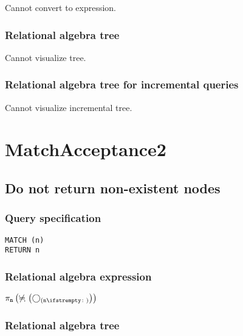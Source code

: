 Cannot convert to expression.

\subsubsection*{Relational algebra tree}

Cannot visualize tree.

\subsubsection*{Relational algebra tree for incremental queries}

Cannot visualize incremental tree.

\section{MatchAcceptance2}

\subsection{Do not return non-existent nodes}

\subsubsection*{Query specification}

\begin{lstlisting}
MATCH (n)
RETURN n
\end{lstlisting}

\subsubsection*{Relational algebra expression}

$\projection{\var{n}} \left(\alldifferent{} \left(\getvertices{n}{}\right)\right)$

\subsubsection*{Relational algebra tree}


